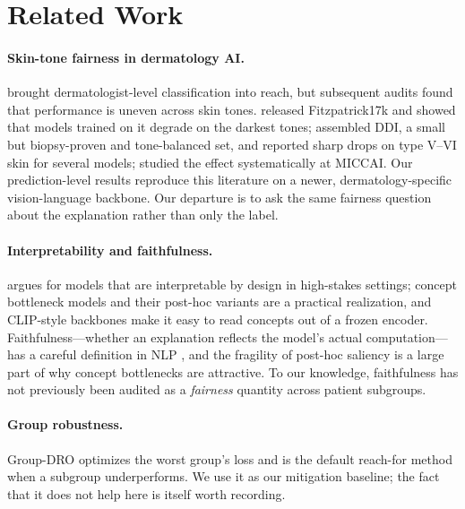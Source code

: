 \documentclass[pmlr,twocolumn,10pt]{jmlr}
\begin{document}
\section{Related Work}
\label{sec:related}

\paragraph{Skin-tone fairness in dermatology AI.}
\citet{esteva2017dermatologist} brought dermatologist-level classification into
reach, but subsequent audits found that performance is uneven across skin
tones. \citet{groh2021evaluating} released Fitzpatrick17k and showed that models
trained on it degrade on the darkest tones; \citet{daneshjou2022disparities}
assembled DDI, a small but biopsy-proven and tone-balanced set, and reported
sharp drops on type V--VI skin for several models; \citet{kinyanjui2020fairness}
studied the effect systematically at MICCAI. Our prediction-level results
reproduce this literature on a newer, dermatology-specific vision-language
backbone. Our departure is to ask the same fairness question about the
explanation rather than only the label.

\paragraph{Interpretability and faithfulness.}
\citet{rudin2019stop} argues for models that are interpretable by design in
high-stakes settings; concept bottleneck models \citep{koh2020concept} and their
post-hoc variants \citep{yuksekgonul2023posthoc} are a practical realization,
and CLIP-style backbones \citep{radford2021learning} make it easy to read
concepts out of a frozen encoder. Faithfulness---whether an explanation
reflects the model's actual computation---has a careful definition in NLP
\citep{jacovi2020towards}, and the fragility of post-hoc saliency
\citep{adebayo2018sanity} is a large part of why concept bottlenecks are
attractive. To our knowledge, faithfulness has not previously been audited as a
\emph{fairness} quantity across patient subgroups.

\paragraph{Group robustness.}
Group-DRO \citep{sagawa2020distributionally} optimizes the worst group's loss
and is the default reach-for method when a subgroup underperforms. We use it
as our mitigation baseline; the fact that it does not help here is itself worth
recording.
\end{document}
